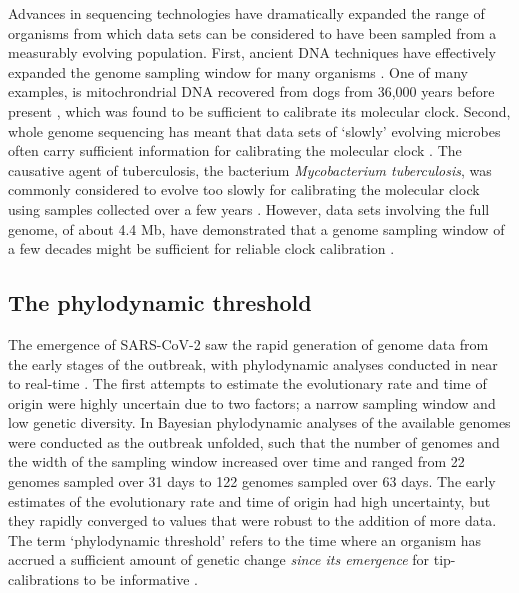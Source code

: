 \documentclass[11pt]{article}
\begin{document}
Advances in sequencing technologies have dramatically expanded the range of organisms from which data sets can be considered to have been sampled from a measurably evolving population. First, ancient DNA techniques have effectively expanded the genome sampling window for many organisms \citep{spyrou2019ancient, duchene2020recovery}. One of many examples, is mitochrondrial DNA recovered from dogs from 36,000 years before present \citep{thalmann2013complete}, which was found to be sufficient to calibrate its molecular clock. Second, whole genome sequencing has meant that data sets of `slowly' evolving microbes often carry sufficient information for calibrating the molecular clock \citep{biek2015measurably}. The causative agent of tuberculosis, the bacterium \textit{Mycobacterium tuberculosis}, was commonly considered to evolve too slowly for calibrating the molecular clock using samples collected over a few years \cite{duchene2016genome}. However, data sets involving the full genome, of about 4.4 Mb, have demonstrated that a genome sampling window of a few decades might be sufficient for reliable clock calibration \citep{menardo2019molecular}.

\subsection{The phylodynamic threshold}
The emergence of SARS-CoV-2 saw the rapid generation of genome data from the early stages of the outbreak, with phylodynamic analyses conducted in near to real-time \citep{attwood2022phylogenetic}. The first attempts to estimate the evolutionary rate and time of origin were highly uncertain due to two factors; a narrow sampling window and low genetic diversity. In \cite{duchene2020temporal} Bayesian phylodynamic analyses of the available genomes were conducted as the outbreak unfolded, such that the number of genomes and the width of the sampling window increased over time and ranged from 22 genomes sampled over 31 days to 122 genomes sampled over 63 days. The early estimates of the evolutionary rate and time of origin had high uncertainty, but they rapidly converged to values that were robust to the addition of more data. The term `phylodynamic threshold' refers to the time where an organism has accrued a sufficient amount of genetic change \textit{since its emergence} for tip-calibrations to be informative \citep{duchene2020temporal}.  
\end{document}
